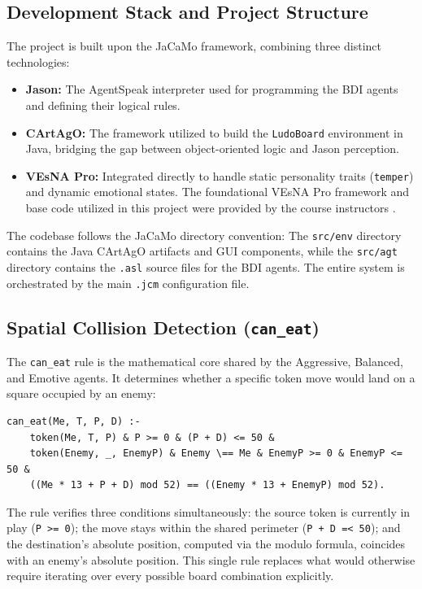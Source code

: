\documentclass[12pt]{article}
\begin{document}
\subsection{Development Stack and Project Structure}
\label{subsec:stack}
\noindent The project is built upon the JaCaMo framework, combining three distinct technologies:
\begin{itemize}
    \item \textbf{Jason:} The AgentSpeak interpreter used for programming the BDI agents and defining their logical rules.
    \item \textbf{CArtAgO:} The framework utilized to build the \texttt{LudoBoard} environment in Java, bridging the gap between object-oriented logic and Jason perception.
    \item \textbf{VEsNA Pro:} Integrated directly to handle static personality traits (\texttt{temper}) and dynamic emotional states. The foundational VEsNA Pro framework and base code utilized in this project were provided by the course instructors \cite{vesna2024}.
\end{itemize}

\noindent The codebase follows the JaCaMo directory convention: The \texttt{src/env} directory contains the Java CArtAgO artifacts and GUI components, while the \texttt{src/agt} directory contains the \texttt{.asl} source files for the BDI agents. The entire system is orchestrated by the main \texttt{.jcm} configuration file.

\subsection{Spatial Collision Detection (\texttt{can\_eat})}
\label{subsec:can_eat}
 
\noindent The \texttt{can\_eat} rule is the mathematical core shared by the
Aggressive, Balanced, and Emotive agents. It determines whether a specific
token move would land on a square occupied by an enemy:
 

\begin{lstlisting}
can_eat(Me, T, P, D) :- 
    token(Me, T, P) & P >= 0 & (P + D) <= 50 & 
    token(Enemy, _, EnemyP) & Enemy \== Me & EnemyP >= 0 & EnemyP <= 50 & 
    ((Me * 13 + P + D) mod 52) == ((Enemy * 13 + EnemyP) mod 52).
\end{lstlisting}

 
\noindent The rule verifies three conditions simultaneously: the source token
is currently in play (\texttt{P >= 0}); the move stays within the shared
perimeter (\texttt{P + D =< 50}); and the destination's absolute position,
computed via the modulo formula, coincides with an enemy's absolute position.
This single rule replaces what would otherwise require iterating over every
possible board combination explicitly.
\end{document}
